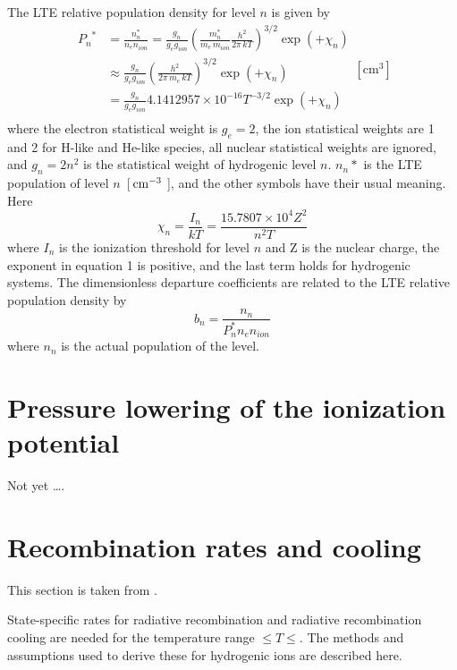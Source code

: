 The LTE relative population density for level $n$ is given by
\begin{equation}
\begin{array}{cl}
 {P_n}^*& = \frac{{n_n^*}}{{{n_e}{n_{ion}}}} =
\frac{{{g_n}}}{{{g_e}{g_{ion}}}}{\left(
{\frac{{m_n^*}}{{{m_e}\,{m_{ion}}}}\frac{{{h^2}}}{{2\pi \,kT}}}
\right)^{3/2}}\exp \left( { + {\chi _n}} \right) \\
&  \approx \frac{{{g_n}}}{{{g_e}{g_{ion}}}}{\left( {\frac{{{h^2}}}{{2\pi
\,{m_e}\,kT}}} \right)^{3/2}}\exp \left( { + {\chi _n}} \right) \\
&  = \frac{{{g_n}}}{{{g_e}{g_{ion}}}}4.1412957 \times {10^{ - 16}}{T^{ -
3/2}}\exp \left( { + {\chi _n}} \right) \\
 \end{array}
\mathrm{[cm^3]}
\end{equation}
where the electron statistical weight is $g_e = 2$, the ion statistical weights
are 1 and 2 for H-like and He-like species,
all nuclear statistical weights are ignored,
and $g_n = 2n^2$ is the statistical weight of hydrogenic level $n$.
$n_n*$ is the LTE population of level $n$~[${\rm\thinspace cm^{-3}}$ ],
and the other symbols have their usual meaning.
Here
\begin{equation}
{\chi _n} = \frac{{{I_n}}}{{kT}} = \frac{{15.7807 \times
{{10}^4}{Z^2}}}{{{n^2}T}}
\end{equation}
where $I_n$ is the ionization threshold for level $n$
and Z is the nuclear charge,
the exponent in equation 1 is positive,
and the last term holds for hydrogenic systems.
The dimensionless departure coefficients are related to the LTE
relative population density by
\begin{equation}
b_n = \frac{n_n}{P_n^* n_e n_{ion}}
\end{equation}
where $n_n$ is the actual population of the level.

\section{Pressure lowering of the ionization potential}

Not yet \dots.%

\section{Recombination rates and cooling}

This section is taken from \citet{Ferland1989}.

State-specific rates for radiative recombination and radiative
recombination cooling are needed for the temperature range
\TEMPLIMITLOW$ \le T \le $\TEMPLIMITHIGH.
The methods and assumptions used to derive these for hydrogenic ions
are described here.

